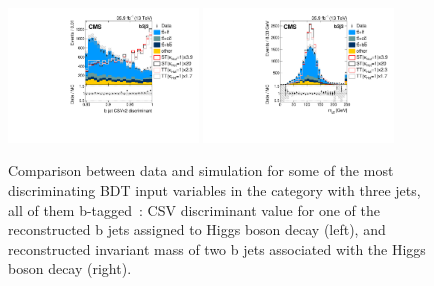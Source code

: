 \documentclass{PoS}
\begin{document}
\begin{figure}[htb]
\centering
\includegraphics[width=0.45\textwidth]{figures/CMS-TOP-17-003_Figure_002-b}
\includegraphics[width=0.45\textwidth]{figures/CMS-TOP-17-003_Figure_002-c}
\caption{
  Comparison between data and simulation for some of the most discriminating
  BDT input variables in the category with three jets, all of them
  b-tagged~\cite{top-17-003}: CSV discriminant value for one of the
  reconstructed b jets assigned to Higgs boson decay (left), and reconstructed
  invariant mass of two b jets associated with the Higgs boson decay (right).
}
\label{fig:TOP-17-003_Figure_002}
\end{figure}
\end{document}
